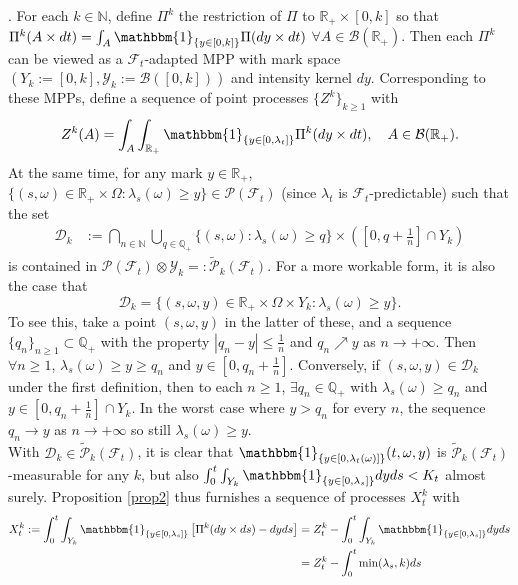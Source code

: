\documentclass[12pt, oneside]{report}
\newcommand{\mbb}[1]{\mathbb{#1}}
\newcommand{\1}[1]{\mathbbm{1}_{\{#1\}}}
\newcommand{\mc}[1]{\mathcal{#1}}
\theoremstyle{definition}
\begin{document}
. For each $k\in\mbb{N}$, define $\Pi^k$ the restriction of
$\Pi$ to $\mbb{R}_+\times[0,k]$ so that $\Pi^k(A\times dt)=\int_A\1{y\in[0,k]}\Pi(dy\times
dt)$ $\forall A\in\mc{B}(\mbb{R}_+)$. Then each $\Pi^k$ can be viewed as a
$\mc{F}_t$-adapted MPP with mark space $(Y_k:=[0,k],\mc{Y}_k:=\mc{B}([0,k]))$
and intensity kernel $dy$. Corresponding to these MPPs, define a sequence of
point processes $\{Z^k\}_{k\geq 1}$ with
\begin{align*}
    Z^k(A)=\int_A\int_{\mbb{R}_+}\1{y\in[0,\lambda_t]}\Pi^k(dy\times dt),\quad A\in\mc{B}(\mbb{R}_+).
\end{align*}
At the same time, for any mark $y\in \mbb{R}_+$,
$\{(s,\omega)\in\mbb{R}_+\times\Omega:\lambda_s(\omega)\geq
y\}\in\mc{P}(\mc{F}_t)$ (since $\lambda_t$ is $\mc{F}_t$-predictable) such that
the set
\begin{align*}
    \mc{D}_k&:=\bigcap_{n\in\mbb{N}}\bigcup_{q\in\mbb{Q}_+}\{(s,\omega):\lambda_s(\omega)\geq q\}\times\left([0,q+\tfrac{1}{n}]\cap Y_k\right)
\end{align*}
is contained in
$\mc{P}(\mc{F}_t)\otimes\mc{Y}_k=:\widetilde{\mc{P}}_k(\mc{F}_t)$. For a more
workable form, it is also the case that
\[\mc{D}_k=\{(s,\omega,y)\in\mbb{R}_+\times\Omega\times
Y_k:\lambda_s(\omega)\geq y\}.\] To see this, take a point $(s,\omega,y)$ in the
latter of these, and a sequence $\{q_n\}_{n\geq 1}\subset\mbb{Q}_+$ with the
property $|q_n-y|\leq\tfrac{1}{n}$ and $q_n\nearrow y$ as $n\rightarrow+\infty$.
Then $\forall n\geq 1$, $\lambda_s(\omega)\geq y\geq q_n$ and
$y\in[0,q_n+\tfrac{1}{n}]$. Conversely, if $(s,\omega,y)\in\mc{D}_k$ under the
first definition, then to each $n\geq 1$, $\exists q_n\in\mbb{Q}_+$ with
$\lambda_s(\omega)\geq q_n$ and $y\in[0,q_n+\tfrac{1}{n}]\cap Y_k$. In the worst
case where $y>q_n$ for every $n$, the sequence $q_n\rightarrow y$ as
$n\rightarrow+\infty$ so still $\lambda_s(\omega)\geq y$.\\[5pt]
With $\mc{D}_k\in\widetilde{\mc{P}}_k(\mc{F}_t)$, it is clear that
$\1{y\in[0,\lambda_t(\omega)]}(t,\omega,y)$ is
$\widetilde{\mc{P}}_k(\mc{F}_t)$-measurable for any $k$, but also
$\int_0^t\int_{Y_k}\1{y\in[0,\lambda_s]}dyds<K_t$ almost surely.
Proposition \ref{prop2} thus furnishes a sequence of processes $X^k_t$ with
\begin{align*}
    X^k_t:=\int_0^t\int_{Y_k}\1{y\in[0,\lambda_s]}\left[\Pi^k(dy\times ds)-dyds\right]&=Z_t^k-\int_0^t\int_{Y_k}\1{y\in[0,\lambda_s]}dyds\\
    &=Z^k_t-\int_0^t\min(\lambda_s,k)ds
\end{align*}
\end{document}
